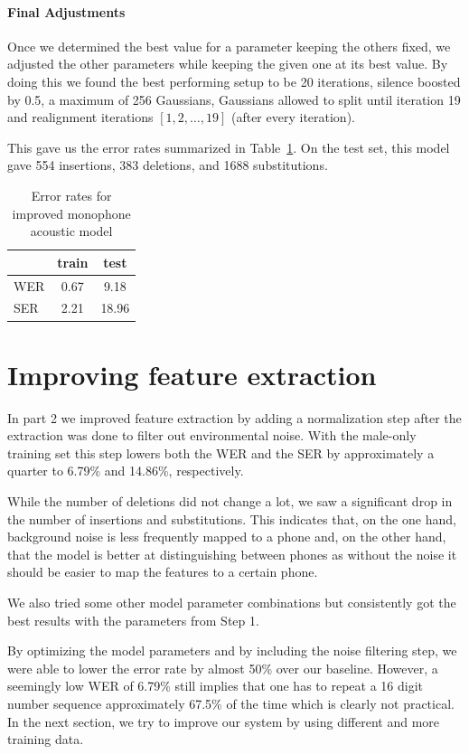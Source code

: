 \documentclass[twocolumn, 11pt]{article}
\begin{document}
\paragraph{Final Adjustments}
Once we determined the best value for a parameter keeping the others fixed, we
adjusted the other parameters while keeping the given one at its best value.
By doing this we found the best performing setup to be  20 iterations, silence boosted by 0.5, a maximum of 256 Gaussians, Gaussians allowed to split until iteration 19 and realignment iterations $[1, 2, \ldots, 19]$ (after every iteration).

This gave us the error rates summarized in Table~\ref{tab:wer-mono}. On the test
set, this model gave 554 insertions, 383 deletions, and 1688 substitutions.

\begin{table}[h]\centering
  \begin{tabular}{lcc}
    \toprule
    & train & test \\
    \midrule
    WER & 0.67 & 9.18 \\
    SER & 2.21 & 18.96 \\
    \bottomrule
  \end{tabular}
  \caption{Error rates for improved monophone acoustic
  model}\label{tab:wer-mono}
\end{table}

\section{Improving feature extraction}

In part 2 we improved feature extraction by adding a normalization step after
the extraction was done to filter out environmental noise. With the male-only
training set this step lowers both the WER and the SER by approximately a
quarter to 6.79\% and 14.86\%, respectively.

While the number of deletions did not change a lot, we saw a significant drop
in the number of insertions and substitutions. This indicates that, on the one
hand, background noise is less frequently mapped to a phone and, on the other
hand, that the model is better at distinguishing between phones as without the
noise it should be easier to map the features to a certain phone.

We also tried some other model parameter combinations but consistently got the
best results with the parameters from Step 1.

By optimizing the model parameters and by including the noise filtering step,
we were able to lower the error rate by almost 50\% over our baseline. However,
a seemingly low WER of 6.79\% still implies that one has to repeat a 16 digit
number sequence approximately 67.5\% of the time which is clearly not
practical. In the next section, we try to improve our system by using
different and more training data.
\end{document}

